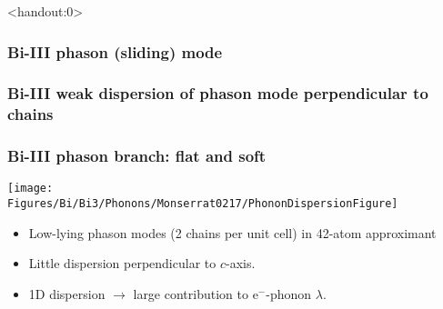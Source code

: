 \begin{frame}<handout:0>
  \frametitle{Bi-III phason (sliding) mode}
  \centerline{}
  \end{frame}
  

\begin{frame}
\frametitle{Bi-III weak dispersion of phason mode perpendicular to chains}
\centerline{}

\end{frame}

\begin{frame}
\frametitle{Bi-III phason branch: flat and soft}
\centerline{\texttt{[image: \\Figures/Bi/Bi3/Phonons/Monserrat0217/PhononDispersionFigure]}}
\begin{itemize}
\item
Low-lying phason modes (2 chains per unit cell) in
42-atom approximant
\item
Little dispersion perpendicular to $c$-axis. %
\item
1D dispersion $\rightarrow$ large contribution to e$^-$-phonon $\lambda$.
\end{itemize}

\end{frame}





